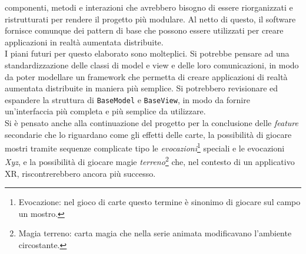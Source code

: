 componenti, metodi e interazioni che avrebbero bisogno di essere riorganizzati e ristrutturati per rendere il progetto più modulare. Al netto di questo, il software fornisce comunque
dei pattern di base che possono essere utilizzati per creare applicazioni in realtà aumentata distribuite.\\
\newline
I piani futuri per questo elaborato sono molteplici. Si potrebbe pensare ad una standardizzazione delle classi di model e view e delle loro comunicazioni, in modo da poter modellare
un framework che permetta di creare applicazioni di realtà aumentata distribuite in maniera più semplice. Si potrebbero revisionare ed espandere la struttura di \texttt{BaseModel} e
\texttt{BaseView}, in modo da fornire un'interfaccia più completa e più semplice da utilizzare.\\
Si è pensato anche alla continuazione del progetto per la conclusione delle \textit{feature} secondarie che lo riguardano come gli effetti delle carte, la possibilità di giocare
mostri tramite sequenze complicate tipo le \textit{evocazioni}\footnote{Evocazione: nel gioco di carte questo termine è sinonimo di giocare sul campo un mostro.} speciali e le evocazioni 
\textit{Xyz}, e la possibilità di giocare magie \textit{terreno}\footnote{Magia terreno: carta magia che nella serie animata modificavano l'ambiente circostante.} che, nel contesto di
un applicativo XR, riscontrerebbero ancora più successo.\\